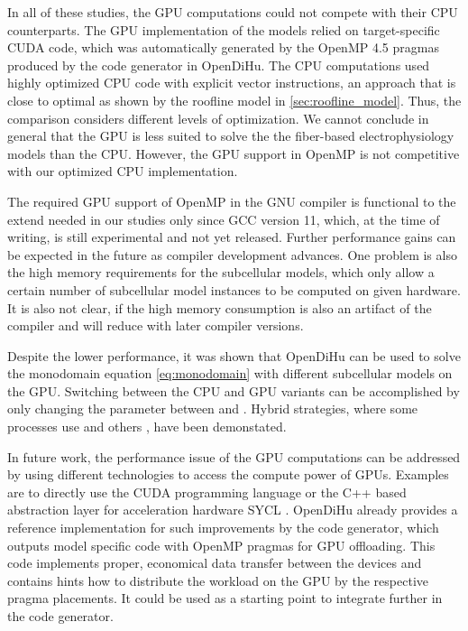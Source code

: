 In all of these studies, the GPU computations could not compete with their CPU counterparts. The GPU implementation of the models relied on target-specific CUDA code, which was automatically generated by the OpenMP 4.5 pragmas produced by the code generator in OpenDiHu. The CPU computations used highly optimized CPU code with explicit vector instructions, an approach that is close to optimal as shown by the roofline model in \cref{sec:roofline_model}. Thus, the comparison considers different levels of optimization. We cannot conclude in general that the GPU is less suited to solve the the fiber-based electrophysiology models than the CPU. However, the GPU support in OpenMP is not competitive with our optimized CPU implementation.

The required GPU support of OpenMP in the GNU compiler is functional to the extend needed in our studies only since GCC version 11, which, at the time of writing, is still experimental and not yet released. Further performance gains can be expected in the future as compiler development advances. One problem is also the high memory requirements for the subcellular models, which only allow a certain number of subcellular model instances to be computed on given hardware. It is also not clear, if the high memory consumption is also an artifact of the compiler and will reduce with later compiler versions.

Despite the lower performance, it was shown that OpenDiHu can be used to solve the monodomain equation \cref{eq:monodomain} with different subcellular models on the GPU. Switching between the CPU and GPU variants can be accomplished by only changing the  parameter between  and . Hybrid strategies, where some processes use  and others , have been demonstated.

In future work, the performance issue of the GPU computations can be addressed by using different technologies to access the compute power of GPUs.
Examples are to directly use the CUDA programming language or the C++ based abstraction layer for acceleration hardware SYCL \cite{sycl}. OpenDiHu already provides a reference implementation for such improvements by the code generator, which outputs model specific code with OpenMP pragmas for GPU offloading. This code implements proper, economical data transfer between the devices and contains hints how to distribute the workload on the GPU by the respective pragma placements. It could be used as a starting point to integrate further  in the code generator.

